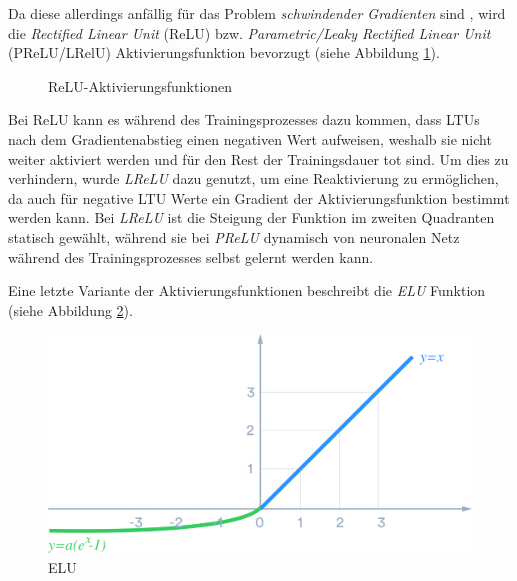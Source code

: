 Da diese allerdings anfällig für das Problem \textit{schwindender Gradienten} sind \cite{AurelienGeron.2018}, wird die \textit{Rectified Linear Unit} (ReLU) bzw. \textit{Parametric/Leaky Rectified Linear Unit} (PReLU/LRelU) Aktivierungsfunktion bevorzugt (siehe Abbildung \ref{relu}). 

\begin{figure}[ht]
	\caption[ReLU-Aktivierungsfunktionen]{ReLU-Aktivierungsfunktionen \cite{DanqingLiu.20171130}} 
	\label{relu}
\end{figure} 

Bei ReLU kann es während des Trainingsprozesses dazu kommen, dass LTUs nach dem Gradientenabstieg einen negativen Wert aufweisen, weshalb sie nicht weiter aktiviert werden und für den Rest der Trainingsdauer \glqq tot\grqq{} sind. Um dies zu verhindern, wurde \textit{LReLU} dazu genutzt, um eine Reaktivierung zu ermöglichen, da auch für negative LTU Werte ein Gradient der Aktivierungsfunktion bestimmt werden kann. Bei \textit{LReLU} ist die Steigung der Funktion im zweiten Quadranten statisch gewählt, während sie bei \textit{PReLU} dynamisch von neuronalen Netz während des Trainingsprozesses selbst gelernt werden kann. \cite{AurelienGeron.2018}

Eine letzte Variante der Aktivierungsfunktionen beschreibt die \textit{ELU} Funktion (siehe Abbildung \ref{elu}).

\begin{figure}[ht]
	\begin{center}
		\includegraphics[width=12cm]{Bilder/elu.png} 
		\caption[ELU]{ELU \cite{DanqingLiu.20171130}}
		\label{elu}
	\end{center}
\end{figure}

